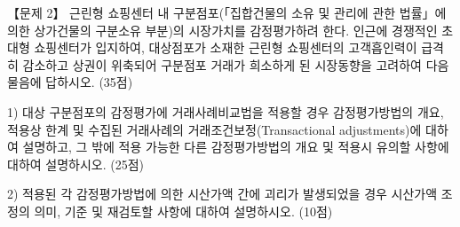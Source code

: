 \begin{longquestion}{【문제 2】}
근린형 쇼핑센터 내 구분점포(「집합건물의 소유 및 관리에 관한 법률」에 의한 상가건물의 구분소유 부분)의 시장가치를 감정평가하려 한다. 인근에 경쟁적인 초대형 쇼핑센터가 입지하여, 대상점포가 소재한 근린형 쇼핑센터의 고객흡인력이 급격히 감소하고 상권이 위축되어 구분점포 거래가 희소하게 된 시장동향을 고려하여 다음 물음에 답하시오. (35점) \par
1) 대상 구분점포의 감정평가에 거래사례비교법을 적용할 경우 감정평가방법의 개요, 적용상 한계 및 수집된 거래사례의 거래조건보정(Transactional adjustments)에 대하여 설명하고, 그 밖에 적용 가능한 다른 감정평가방법의 개요 및 적용시 유의할 사항에 대하여 설명하시오. (25점) \par
2) 적용된 각 감정평가방법에 의한 시산가액 간에 괴리가 발생되었을 경우 시산가액 조정의 의미, 기준 및 재검토할 사항에 대하여 설명하시오. (10점) \par
\end{longquestion}
